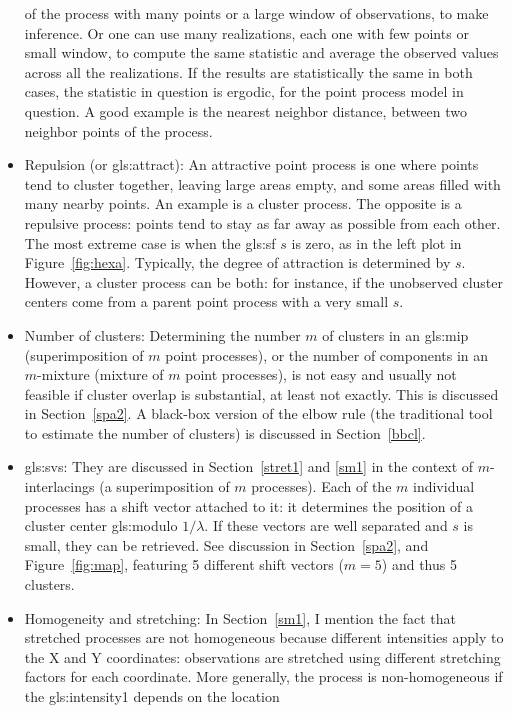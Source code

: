 \documentclass[10pt]{article}
\begin{document}
\begin{itemize}
of the process with many points or a large window of observations, to make inference. Or one can use many realizations, each one with few points or small window, to compute the same statistic and average the observed values across all the realizations.  If the results are statistically the same in both cases, the statistic in question is ergodic, for the point process model in question. A good example is the \textcolor{index}{nearest neighbor distance},
between two neighbor points of the process.
\item Repulsion (or \gls{gls:attract}):  An \textcolor{index}{attractive point process} is one where points tend to cluster together, leaving large areas empty, and some areas filled with many nearby points. An example is a \textcolor{index}{cluster process}. The opposite is a repulsive process: points tend to stay as far away as possible from each other. The most extreme case is when the \gls{gls:sf} $s$ is zero, as in the left plot in Figure~\ref{fig:hexa}. Typically, the degree of attraction is determined by $s$. However, a cluster process can be both: for instance, if the unobserved cluster centers come from a
\textcolor{index}{parent point process} with a very small $s$.
\item Number of clusters: Determining the number $m$ of clusters in an \gls{gls:mip} (superimposition of $m$ point processes), or the number of components in an \textcolor{index}{$m$-mixture} (mixture of $m$ point processes), is not easy and usually
not feasible if cluster overlap is substantial, at least not exactly. This is discussed in Section~\ref{spa2}. A black-box version of the \textcolor{index}{elbow rule} (the traditional tool to estimate the number of clusters)
is discussed in Section~\ref{bbcl}.
\item \Glspl{gls:sv}: They are discussed in Section~\ref{stret1} and \ref{sm1} in the context of $m$-interlacings (a superimposition of $m$ processes). Each of the $m$
individual processes has a shift vector attached to it: it determines the position of a cluster center
\gls{gls:modulo} $1/\lambda$. If these vectors are well separated and $s$ is small, they can be retrieved. See discussion in Section~\ref{spa2}, and Figure~\ref{fig:map}, featuring 5 different shift vectors ($m=5$) and thus 5 clusters.
\item \textcolor{index}{Homogeneity} and \textcolor{index}{stretching}: In Section~\ref{sm1}, I mention the fact that stretched processes are not homogeneous because different intensities apply to the X and Y coordinates: observations are stretched using different stretching factors for each coordinate. More generally, the process is non-homogeneous if the \gls{gls:intensity1} depends on the location

\end{itemize}
\end{document}
